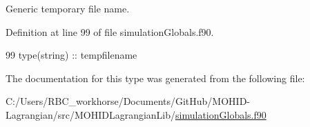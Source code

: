 Generic temporary file name. 



Definition at line 99 of file simulation\+Globals.\+f90.


\begin{DoxyCode}
99         \textcolor{keywordtype}{type}(string) :: tempfilename
\end{DoxyCode}


The documentation for this type was generated from the following file\+:\begin{DoxyCompactItemize}
\item 
C\+:/\+Users/\+R\+B\+C\+\_\+workhorse/\+Documents/\+Git\+Hub/\+M\+O\+H\+I\+D-\/\+Lagrangian/src/\+M\+O\+H\+I\+D\+Lagrangian\+Lib/\mbox{\hyperlink{simulation_globals_8f90}{simulation\+Globals.\+f90}}\end{DoxyCompactItemize}
